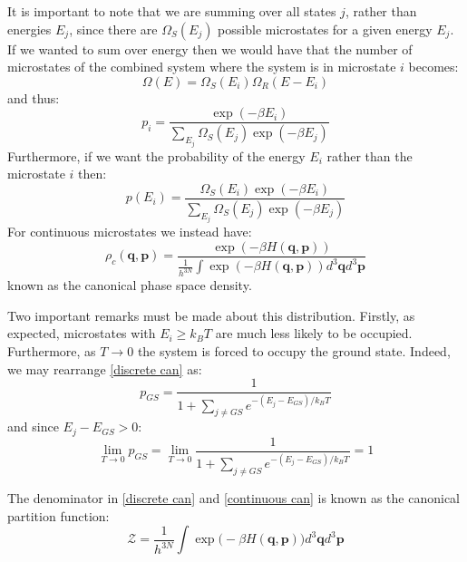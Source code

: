 \documentclass[a4paper,11pt,oneside]{book}
\begin{document}
It is important to note that we are summing over all states $j$, rather than energies $E_j$, since there are $\Omega_S(E_j)$ possible microstates for a given energy $E_j$. If we wanted to sum over energy then we would have that the number of microstates of the combined system where the system is in microstate $i$ becomes:
\begin{equation}
    \Omega(E) = \Omega_S(E_i) \Omega_R(E-E_i)
\end{equation}
and thus:
\begin{equation}
    p_i = \frac{ \exp (-\beta E_i)}{\sum_{E_j} \Omega_S(E_j)\exp (-\beta E_j) }
\end{equation}
Furthermore, if we want the probability of the energy $E_i$ rather than the microstate $i$ then:
\begin{equation}
    p(E_i) = \frac{ \Omega_S(E_i) \exp (-\beta E_i)}{\sum_{E_j} \Omega_S(E_j)\exp (-\beta E_j) }
\end{equation}
For continuous microstates we instead have:
\begin{equation}\label{continuous can}
    \boxed{\rho_c(\textbf{q},\textbf{p}) = \frac{ \exp (-\beta {H(\textbf{q},\textbf{p})})}{\frac{1}{h^{3N}} \int \exp (-\beta H(\textbf{q},\textbf{p})) d^3\textbf{q}d^3\textbf{p}}}
\end{equation}
known as the canonical phase space density.

Two important remarks must be made about this distribution. Firstly, as expected, microstates with $E_i \geq k_B T$ are much less likely to be occupied. Furthermore, as $T \rightarrow 0$ the system is forced to occupy the ground state. Indeed, we may rearrange \eqref{discrete can} as:
\begin{equation}
    p_{GS} = \frac{1}{1+\sum_{j \neq GS} e^{-(E_j-E_{GS})/k_B T}}
\end{equation}
and since $E_j-E_{GS} > 0$:
\begin{equation}
    \lim_{T \rightarrow 0} p_{GS} = \lim_{T \rightarrow 0} \frac{1}{1+\sum_{j \neq GS} e^{-(E_j-E_{GS})/k_B T}} = 1
\end{equation}

The denominator in \eqref{discrete can} and \eqref{continuous can} is known as the canonical partition function:
\begin{equation}
    \boxed{\mathcal{Z}=\frac{1}{h^{3N}} \int \exp \Big(-\beta H(\textbf{q},\textbf{p})\Big) d^3\textbf{q} d^3\textbf{p}}
\end{equation}
\end{document}
